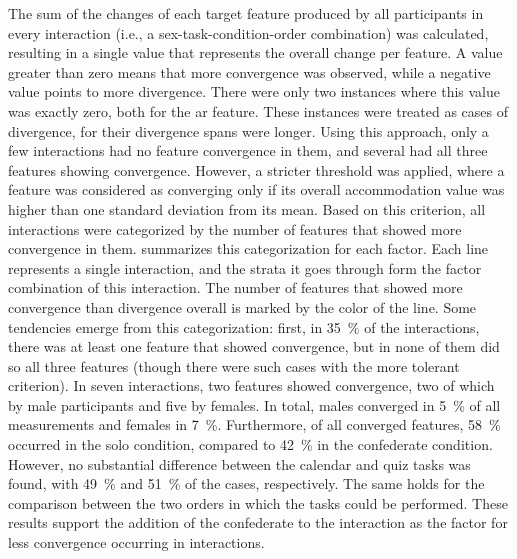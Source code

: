 %
The sum of the changes of each target feature produced by all participants in every interaction (i.e., a sex-task-condition-order combination) was calculated, resulting in a single value that represents the overall change per feature.
A value greater than zero means that more convergence was observed, while a negative value points to more divergence.
There were only two instances where this value was exactly zero, both for the \ac{ar} feature.
These instances were treated as cases of divergence, for their divergence spans were longer.
Using this approach, only a few interactions had no feature convergence in them, and several had all three features showing convergence.
However, a stricter threshold was applied, where a feature was considered as converging only if its overall accommodation value was higher than one standard deviation from its mean.
Based on this criterion, all interactions were categorized by the number of features that showed more convergence in them.
 summarizes this categorization for each factor.
Each line represents a single interaction, and the strata it goes through form the factor combination of this interaction.
The number of features that showed more convergence than divergence overall is marked by the color of the line.
Some tendencies emerge from this categorization:
first, in \SI{35}{\percent} of the interactions, there was at least one feature that showed convergence, but in none of them did so all three features (though there were such cases with the more tolerant criterion).
In seven interactions, two features showed convergence, two of which by male participants and five by females.
In total, males converged in \SI{5}{\percent} of all measurements and females in \SI{7}{\percent}.
Furthermore, of all converged features, \SI{58}{\percent} occurred in the solo condition, compared to \SI{42}{\percent} in the confederate condition.
However, no substantial difference between the calendar and quiz tasks was found, with \SI{49}{\percent} and \SI{51}{\percent} of the cases, respectively.
The same holds for the comparison between the two orders in which the tasks could be performed.
These results support the addition of the confederate to the interaction as the factor for less convergence occurring in interactions.
%
